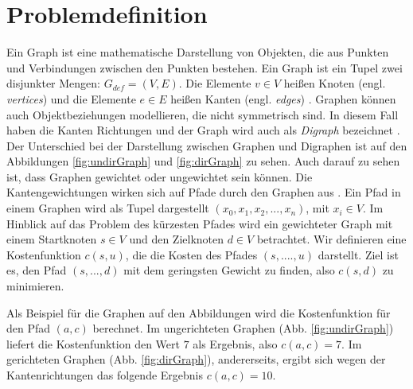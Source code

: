 \section{Problemdefinition}
\label{Kostenfunktion}
Ein Graph ist eine mathematische Darstellung von Objekten, die aus Punkten und Verbindungen zwischen den Punkten bestehen. 
Ein Graph ist ein Tupel zwei disjunkter Mengen: $G_{def}= (V,E)$. Die Elemente $v \in V$ heißen Knoten (engl. \textit{vertices}) und die Elemente $e \in E$ heißen Kanten (engl. \textit{edges}) \cite[D1]{Gross.2004}. Graphen können auch Objektbeziehungen modellieren, die nicht symmetrisch sind. In diesem Fall haben die Kanten Richtungen und der Graph wird auch als \textit{Digraph} bezeichnet \cite[S.4]{Gross.2004}. Der Unterschied bei der Darstellung zwischen Graphen und Digraphen ist auf den Abbildungen \ref{fig:undirGraph} und \ref{fig:dirGraph} zu sehen. Auch darauf zu sehen ist, dass Graphen gewichtet oder ungewichtet sein können. Die Kantengewichtungen wirken sich auf Pfade durch den Graphen aus \cite[S.4]{Gross.2004}. 
Ein Pfad in einem Graphen wird als Tupel dargestellt $\left ( x_{0}, x_{1}, x_{2}, ..., x_{n} \right )$, mit $x_{i} \in V$. 
Im Hinblick auf das Problem des kürzesten Pfades wird ein gewichteter Graph mit einem Startknoten $s \in V$ und den Zielknoten $d \in V$ betrachtet. Wir definieren eine Kostenfunktion $c(s,u)$, die die Kosten des Pfades $ (s, ...., u)$ darstellt. Ziel ist es, den Pfad  $\left ( s, ..., d \right )$ mit dem geringsten Gewicht zu finden, also $c(s,d)$ zu minimieren.

Als Beispiel für die Graphen auf den Abbildungen wird die Kostenfunktion für den Pfad $(a,c)$ berechnet. Im ungerichteten Graphen (Abb. \ref{fig:undirGraph}) liefert die Kostenfunktion den Wert $7$ als Ergebnis, also $c(a,c) = 7$. Im gerichteten Graphen (Abb. \ref{fig:dirGraph}), andererseits, ergibt sich wegen der Kantenrichtungen das folgende Ergebnis $c(a,c) = 10$.


